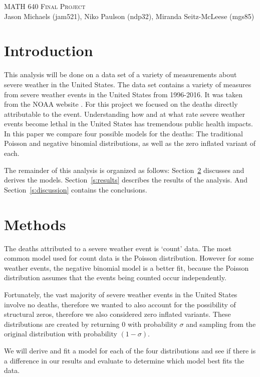 \documentclass{article}\usepackage[]{graphicx}\usepackage[]{color}
\begin{document}
\begin{center}
	\vspace{0.1cm}
	\textsc{\LARGE MATH 640 Final Project} \\[0.1cm]
	Jason Michaels (jam521), Niko Paulson (ndp32), Miranda Seitz-McLeese (mgs85) 
\end{center}
\section{Introduction}
\label{s:intro}
This analysis will be done on a data set of a variety of measurements about severe weather in the United States. 
The data set contains a variety of measures from severe weather events in the United States from 1996-2016. It was taken from the NOAA website \cite{dataset}.
For this project we focused on the deaths directly attributable to the event.
Understanding how and at what rate severe weather events become lethal in the United States has tremendous public health impacts.
In this paper we compare four possible models for the deaths: The traditional Poisson and negative binomial distributions, as well as the zero inflated variant of each.

The remainder of this analysis is organized as follows: Section~\ref{s:methods} discusses and derives the models. Section~\ref{s:results} describes the results of the analysis. And Section~\ref{s:discussion} contains the conclusions.

\section{Methods}
\label{s:methods}
The deaths attributed to a severe weather event is `count' data. 
The most common model used for count data is the Poisson distribution. 
However for some weather events, the negative binomial model is a better fit, because the Poisson distribution assumes that the events being counted occur independently.

Fortunately, the vast majority of severe weather events in the United States involve no deaths, therefore we wanted to also account for the possibility of structural zeros, therefore we also considered zero inflated variants. 
These distributions are created by returning $0$ with probability $\sigma$ and sampling from the original distribution with probability $(1-\sigma)$. 

We will derive and fit a model for each of the four distributions and see if there is a difference in our results and evaluate to determine which model best fits the data.
\end{document}
